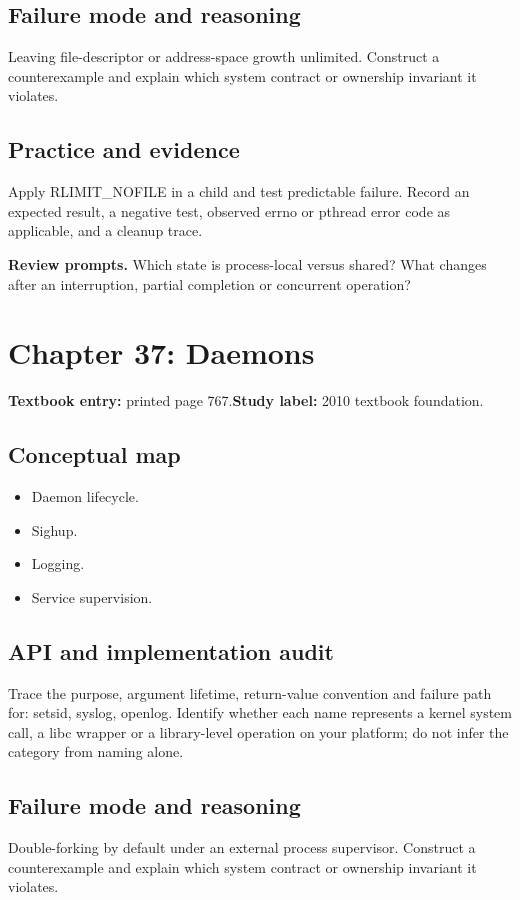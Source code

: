 \documentclass[11pt,letterpaper,oneside]{report}
\begin{document}
\subsection{Failure mode and reasoning}
Leaving file-descriptor or address-space growth unlimited. Construct a counterexample and explain which system contract or ownership invariant it violates.

\subsection{Practice and evidence}
Apply RLIMIT\_NOFILE in a child and test predictable failure. Record an expected result, a negative test, observed errno or pthread error code as applicable, and a cleanup trace.

\textbf{Review prompts.} Which state is process-local versus shared? What changes after an interruption, partial completion or concurrent operation?

\section{Chapter 37: Daemons}
\textbf{Textbook entry:} printed page 767.\quad \textbf{Study label:} 2010 textbook foundation.

\subsection{Conceptual map}
\begin{itemize}
\item Daemon lifecycle.
\item Sighup.
\item Logging.
\item Service supervision.
\end{itemize}
\subsection{API and implementation audit}
Trace the purpose, argument lifetime, return-value convention and failure path for: setsid, syslog, openlog. Identify whether each name represents a kernel system call, a libc wrapper or a library-level operation on your platform; do not infer the category from naming alone.

\subsection{Failure mode and reasoning}
Double-forking by default under an external process supervisor. Construct a counterexample and explain which system contract or ownership invariant it violates.
\end{document}
